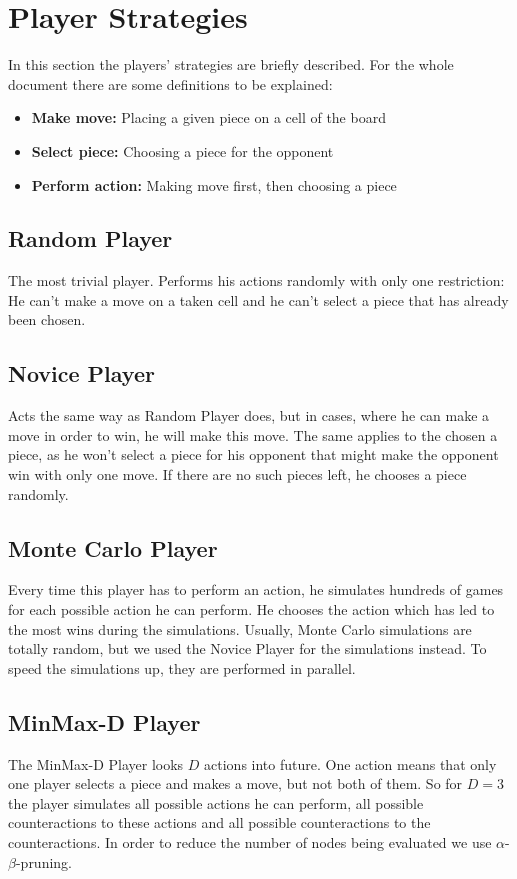 \chapter{Player Strategies}
In this section the players' strategies are briefly described. For the whole document there are some definitions to be explained:
\begin{itemize}
	\item \textbf{Make move:} Placing a given piece on a cell of the board
	\item \textbf{Select piece:} Choosing a piece for the opponent
	\item \textbf{Perform action:} Making move first, then choosing a piece
\end{itemize}
\section{Random Player}
The most trivial player. Performs his actions randomly with only one restriction: He can't make a move on a taken cell and he can't select a piece that has already been chosen.
\section{Novice Player}
Acts the same way as Random Player does, but in cases, where he can make a move in order to win, he will make this move. The same applies to the chosen a piece, as he won't select a piece for his opponent that might make the opponent win with only one move. If there are no such pieces left, he chooses a piece randomly.
\section{Monte Carlo Player}
Every time this player has to perform an action, he simulates hundreds of games for each possible action he can perform. He chooses the action which has led to the most wins during the simulations. Usually, Monte Carlo simulations are totally random, but we used the Novice Player for the simulations instead. To speed the simulations up, they are performed in parallel.
\section{MinMax-D Player}
The MinMax-D Player looks $D$ actions into future. One action means that only one player selects a piece and makes a move, but not both of them. So for $D=3$ the player simulates all possible actions he can perform, all possible counteractions to these actions and all possible counteractions to the counteractions. In order to reduce the number of nodes being evaluated we use $\alpha$-$\beta$-pruning.

